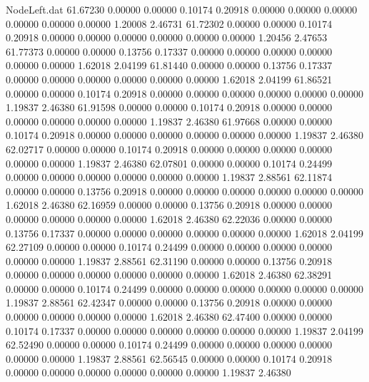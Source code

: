 \begin{filecontents}{NodeLeft.dat}
  61.67230    0.00000    0.00000     0.10174    0.20918    0.00000    0.00000    0.00000    0.00000    0.00000    0.00000    1.20008    2.46731
  61.72302    0.00000    0.00000     0.10174    0.20918    0.00000    0.00000    0.00000    0.00000    0.00000    0.00000    1.20456    2.47653
  61.77373    0.00000    0.00000     0.13756    0.17337    0.00000    0.00000    0.00000    0.00000    0.00000    0.00000    1.62018    2.04199
  61.81440    0.00000    0.00000     0.13756    0.17337    0.00000    0.00000    0.00000    0.00000    0.00000    0.00000    1.62018    2.04199
  61.86521    0.00000    0.00000     0.10174    0.20918    0.00000    0.00000    0.00000    0.00000    0.00000    0.00000    1.19837    2.46380
  61.91598    0.00000    0.00000     0.10174    0.20918    0.00000    0.00000    0.00000    0.00000    0.00000    0.00000    1.19837    2.46380
  61.97668    0.00000    0.00000     0.10174    0.20918    0.00000    0.00000    0.00000    0.00000    0.00000    0.00000    1.19837    2.46380
  62.02717    0.00000    0.00000     0.10174    0.20918    0.00000    0.00000    0.00000    0.00000    0.00000    0.00000    1.19837    2.46380
  62.07801    0.00000    0.00000     0.10174    0.24499    0.00000    0.00000    0.00000    0.00000    0.00000    0.00000    1.19837    2.88561
  62.11874    0.00000    0.00000     0.13756    0.20918    0.00000    0.00000    0.00000    0.00000    0.00000    0.00000    1.62018    2.46380
  62.16959    0.00000    0.00000     0.13756    0.20918    0.00000    0.00000    0.00000    0.00000    0.00000    0.00000    1.62018    2.46380
  62.22036    0.00000    0.00000     0.13756    0.17337    0.00000    0.00000    0.00000    0.00000    0.00000    0.00000    1.62018    2.04199
  62.27109    0.00000    0.00000     0.10174    0.24499    0.00000    0.00000    0.00000    0.00000    0.00000    0.00000    1.19837    2.88561
  62.31190    0.00000    0.00000     0.13756    0.20918    0.00000    0.00000    0.00000    0.00000    0.00000    0.00000    1.62018    2.46380
  62.38291    0.00000    0.00000     0.10174    0.24499    0.00000    0.00000    0.00000    0.00000    0.00000    0.00000    1.19837    2.88561
  62.42347    0.00000    0.00000     0.13756    0.20918    0.00000    0.00000    0.00000    0.00000    0.00000    0.00000    1.62018    2.46380
  62.47400    0.00000    0.00000     0.10174    0.17337    0.00000    0.00000    0.00000    0.00000    0.00000    0.00000    1.19837    2.04199
  62.52490    0.00000    0.00000     0.10174    0.24499    0.00000    0.00000    0.00000    0.00000    0.00000    0.00000    1.19837    2.88561
  62.56545    0.00000    0.00000     0.10174    0.20918    0.00000    0.00000    0.00000    0.00000    0.00000    0.00000    1.19837    2.46380

\end{filecontents}
